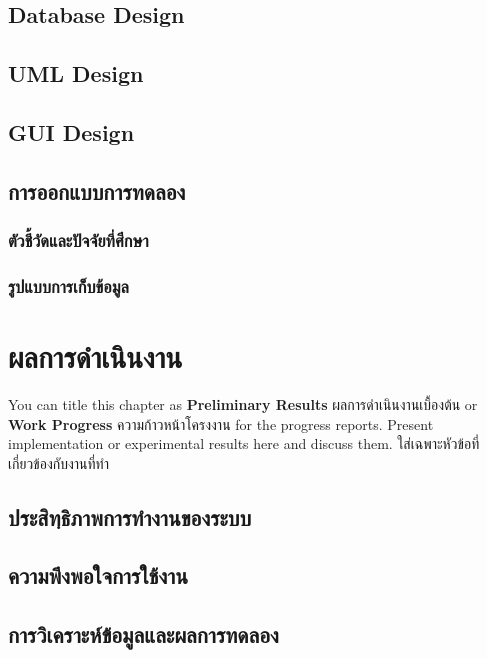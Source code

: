 \documentclass[12pt,oneside,openright,a4paper]{cpe-thai-project}
\begin{document}
\section{Database Design}

\section{UML Design}

\section{GUI Design}

\section{การออกแบบการทดลอง}
\subsection{ตัวชี้วัดและปัจจัยที่ศึกษา}
\subsection{รูปแบบการเก็บข้อมูล}




\chapter{ผลการดำเนินงาน}

You can title this chapter as \textbf{Preliminary Results} ผลการดำเนินงานเบื้องต้น or \textbf{Work Progress} ความก้าวหน้าโครงงาน for the progress reports. Present implementation or experimental results here and discuss them.
ใส่เฉพาะหัวข้อที่เกี่ยวข้องกับงานที่ทำ 

\section{ประสิทฺธิภาพการทำงานของระบบ} 
\section{ความพึงพอใจการใช้งาน}
\section{การวิเคราะห์ข้อมูลและผลการทดลอง}
\end{document}
